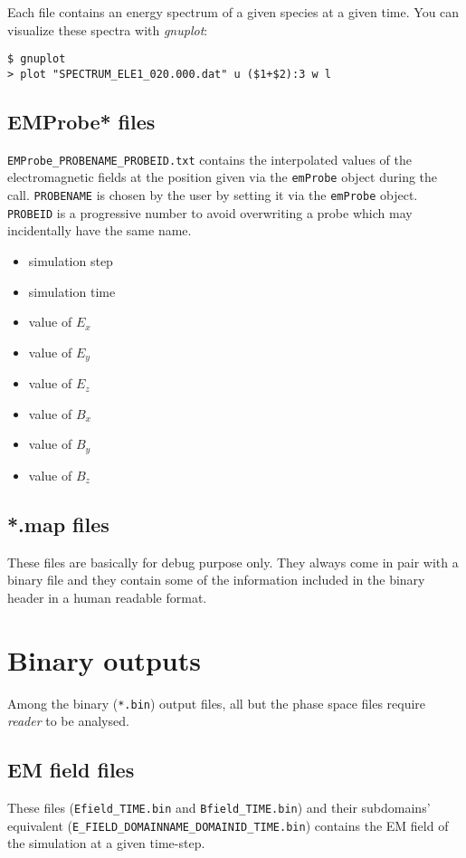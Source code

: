 \documentclass[11pt,a4paper]{report}
\begin{document}
Each file contains an energy spectrum of a given species at a given time. You can visualize these spectra with \emph{gnuplot}:
\begin{verbatim}
$ gnuplot
> plot "SPECTRUM_ELE1_020.000.dat" u ($1+$2):3 w l
\end{verbatim}
\subsection{EMProbe* files}
\verb+EMProbe_PROBENAME_PROBEID.txt+ contains the interpolated values of the electromagnetic fields at the position given via the \verb+emProbe+ object during the call. \verb+PROBENAME+ is chosen by the user by setting it via the \verb+emProbe+ object. \verb+PROBEID+ is a progressive number to avoid overwriting a probe which may incidentally have the same name.
\begin{itemize}
\item simulation step
\item simulation time
\item value of $E_x$
\item value of $E_y$
\item value of $E_z$
\item value of $B_x$
\item value of $B_y$
\item value of $B_z$
\end{itemize}

\subsection{*.map files}
These files are basically for debug purpose only. They always come in pair with a binary file and they contain some of the information included in the binary header in a human readable format.

\section{Binary outputs}
Among the binary (\verb+*.bin+) output files, all but the phase space files require \emph{reader} to be analysed. 
\subsection{EM field files}
These files (\verb+Efield_TIME.bin+ and \verb+Bfield_TIME.bin+) and their subdomains' equivalent (\verb+E_FIELD_DOMAINNAME_DOMAINID_TIME.bin+) contains the EM field of the simulation at a given time-step.
\end{document}
